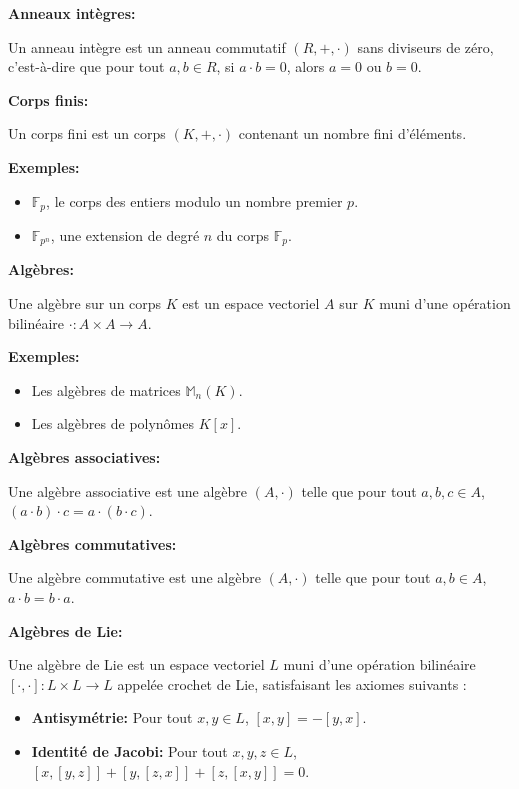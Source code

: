 \textbf{Anneaux intègres:}

Un anneau intègre est un anneau commutatif $(R, +, \cdot)$ sans diviseurs de zéro, c'est-à-dire que pour tout $a, b \in R$, si $a \cdot b = 0$, alors $a = 0$ ou $b = 0$.

\textbf{Corps finis:}

Un corps fini est un corps $(K, +, \cdot)$ contenant un nombre fini d'éléments.

\textbf{Exemples:}
\begin{itemize}
    \item $\mathbb{F}_p$, le corps des entiers modulo un nombre premier $p$.
    \item $\mathbb{F}_{p^n}$, une extension de degré $n$ du corps $\mathbb{F}_p$.
\end{itemize}

\textbf{Algèbres:}

Une algèbre sur un corps $K$ est un espace vectoriel $A$ sur $K$ muni d'une opération bilinéaire $\cdot : A \times A \to A$.

\textbf{Exemples:}
\begin{itemize}
    \item Les algèbres de matrices $\mathbb{M}_n(K)$.
    \item Les algèbres de polynômes $K[x]$.
\end{itemize}

\textbf{Algèbres associatives:}

Une algèbre associative est une algèbre $(A, \cdot)$ telle que pour tout $a, b, c \in A$, $(a \cdot b) \cdot c = a \cdot (b \cdot c)$.

\textbf{Algèbres commutatives:}


Une algèbre commutative est une algèbre $(A, \cdot)$ telle que pour tout $a, b \in A$, $a \cdot b = b \cdot a$.

\textbf{Algèbres de Lie:}

Une algèbre de Lie est un espace vectoriel $L$ muni d'une opération bilinéaire $[\cdot, \cdot] : L \times L \to L$ appelée crochet de Lie, satisfaisant les axiomes suivants :
\begin{itemize}
    \item \textbf{Antisymétrie:} Pour tout $x, y \in L$, $[x, y] = -[y, x]$.
    \item \textbf{Identité de Jacobi:} Pour tout $x, y, z \in L$, $[x, [y, z]] + [y, [z, x]] + [z, [x, y]] = 0$.
\end{itemize}
